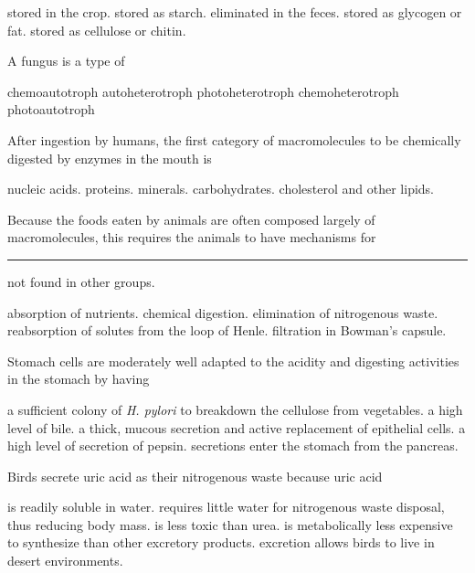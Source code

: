 \begin{choices}
\choice stored in the crop. 
\choice stored as starch. 
\choice eliminated in the feces. 
\correctchoice stored as glycogen or fat. 
\choice stored as cellulose or chitin. 
\end{choices}

\question
A fungus is a type of 
\begin{choices}
\choice chemoautotroph 
\choice  autoheterotroph 
\choice  photoheterotroph 
\correctchoice chemoheterotroph 
\choice  photoautotroph 
\end{choices}

\question
After ingestion by humans, the first category of macromolecules to be chemically digested by enzymes in the mouth is

\begin{choices}
\choice nucleic acids. 
\choice proteins. 
\choice minerals. 
\correctchoice carbohydrates. 
\choice cholesterol and other lipids. 
\end{choices}

\question
Because the foods eaten by animals are often composed largely of macromolecules, this requires the animals to have mechanisms for \rule{1in}{0.4pt} not found in other groups.

\begin{choices}
\choice absorption of nutrients. 
\correctchoice chemical digestion. 
\choice elimination of nitrogenous waste. 
\choice reabsorption of solutes from the loop of Henle. 
\choice filtration in Bowman's capsule. 
\end{choices}

\question
Stomach cells are moderately well adapted to the acidity and digesting activities in the stomach by having

\begin{choices}
\choice a sufficient colony of \textit{H. pylori} to breakdown the cellulose from vegetables. 
\choice a high level of bile. 
\correctchoice a thick, mucous secretion and active replacement of epithelial cells. 
\choice a high level of secretion of pepsin. 
\choice secretions enter the stomach from the pancreas. 
\end{choices}

\newpage

\question
Birds secrete uric acid as their nitrogenous waste because uric acid

\begin{choices}
\choice is readily soluble in water. 
\correctchoice requires little water for nitrogenous waste disposal, thus reducing body mass. 
\correctchoice is less toxic than urea. 
\choice is metabolically less expensive to synthesize than other excretory products. 
\choice excretion allows birds to live in desert environments. 
\end{choices}

